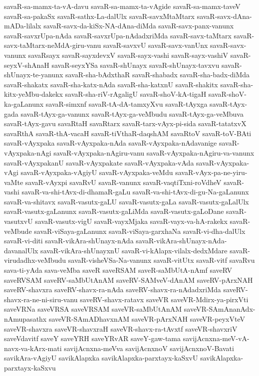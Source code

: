{savaR-sa-mamx-ta-vA-davu
savaR-sa-mamx-ta-vAgide
savaR-sa-mamx-taveV
savaR-sa-pakaSx
savaR-sathx-La-dalUlx
savaR-savxMtaMtarx
savaR-savx-dAna-mADa-lilalx
savaR-savx-da-kiSx-NA-dAna-diMda
savaR-savx-panx-vanunx
savaR-savxrUpa-nAda
savaR-savxrUpa-nAdadxriMda
savaR-savx-taMtarx
savaR-savx-taMtarx-neMdA-giru-vanu
savaR-savxvU
savaR-savx-vanUnx
savaR-savx-vanunx
savaRsayx
savaR-sayxdevxV
savaR-sayx-vashi
savaR-sayx-vashiV
savaR-seyxV-shAnaH
savaR-seyxYSa
savaR-shUnayx
savaR-shUnayx-tavxvu
savaR-shUnayx-te-yanunx
savaR-sha-bAdxthaR
savaR-shabadx
savaR-sha-badx-diMda
savaR-shakatx
savaR-sha-katx-nAda
savaR-sha-katxnU
savaR-shakitx
savaR-sha-kitx-yeMbu-dakekx
savaR-sha-riV-rAgaligU
savaR-shoV-kA-tigaH
savaR-shoV-ka-gaLanunx
savaR-simxnf
savaR-tA-dA-tamxyXvu
savaR-tAyxga
savaR-tAyx-gada
savaR-tAyx-ga-vanunx
savaR-tAyx-ga-veMbudu
savaR-tAyx-ga-veMbuva
savaR-tAyx-gavu
savaRtaH
savaRtarx
savaR-tarx-vAyx-pi-sida
savaR-tatatxvX
savaRthA
savaR-thA-vacaH
savaR-tiVthaR-daqshAM
savaRtoV
savaR-toV-BAti
savaR-vAyxpaka
savaR-vAyxpaka-nAda
savaR-vAyxpaka-nAdavanige
savaR-vAyxpaka-nAgi
savaR-vAyxpaka-nAgiru-vanu
savaR-vAyxpaka-nAgiru-va-vanunx
savaR-vAyxpakanU
savaR-vAyxpakate
savaR-vAyxpaka-vAda
savaR-vAyxpaka-vAgi
savaR-vAyxpaka-vAgiyU
savaR-vAyxpaka-veMdu
savaR-vAyx-pa-ne-yiru-vaMte
savaR-vAyxpi
savaRvU
savaR-vanunx
savaR-vaqtiTxni-roVdheV
savaR-vashi
savaR-va-shi-tAvx-di-dhamaR-gaLu
savaR-va-shi-tAvx-di-gu-Na-gaLanunx
savaR-va-shitavx
savaR-vasutx-gaLU
savaR-vasutx-gaLa
savaR-vasutx-gaLalUlx
savaR-vasutx-gaLanunx
savaR-vasutx-gaLiMda
savaR-vasutx-gaLoDane
savaR-vasutxvU
savaR-vasutx-vigU
savaR-vayxMjaka
savaR-vayx-va-hA-rakekx
savaR-veMbude
savaR-viSaya-gaLanunx
savaR-viSaya-garxhaNa
savaR-vi-dha-dalUlx
savaR-vi-diti
savaR-vikAra-shUnayx-nAda
savaR-vikAra-shUnayx-nAda-davanalUlx
savaR-vikAra-shUnayxnU
savaR-vi-kAlapx-vilalx-dedxMdare
savaR-virudadhx-veMbudu
savaR-visheVSa-Na-vanunx
savaR-vitUtx
savaR-vitf
savaRvu
sava-ti-yAda
sava-veMba
saveR
saveRSAM
saveR-saMbUtA-nAmf
saveRV
saveRVSAM
saveRV-saMbUtAnAM
saveRV-SAMveV-dAnAM
saveRV-pArxNAH
saveRV-shavxra
saveRV-shavx-ra-nAda
saveRV-shavx-ra-nAdadxriMda
saveRV-shavx-ra-ne-ni-siru-vanu
saveRV-shavx-ratavx
saveVR
saveVR-Mdirx-ya-pirxVti
saveVRNa
saveVRSA
saveVRSAM
saveVR-saMbUtAnAM
saveVR-SAmAnanAdx-nAmupasathx
saveVR-SAmADhavxnAM
saveVR-pArxNAH
saveVR-peyxVteV
saveVR-shavxra
saveVR-shavxraH
saveVR-shavx-ra-tAvxtf
saveVR-shavxriV
saveVdavitf
saveY
saveYRH
saveYRvAR
saveY-gaw-tama
savijAcnxna-meV-vA-navx-va-kArx-mati
savijAcnxna-meVva
savijAcnxnoV
savijAcnxnoV-Bavati
savikAra-vAgiyU
savikAlapxka
savikAlapxka-parxtayx-kaSxvU
savikAlapxka-parxtayx-kaSxvu
}
